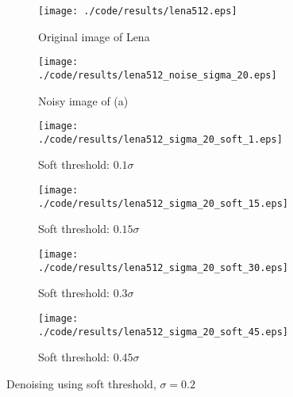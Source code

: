 \documentclass[journal,comsoc]{IEEEtran}
\begin{document}
\begin{figure}[!hbt]
  \centering
  \begin{subfigure}{.25\textwidth}
    \centering
    \texttt{[image: ./code/results/lena512.eps]}
    \caption{Original image of Lena}
    \label{subfig:original-image-of-lena}
  \end{subfigure}%
  \begin{subfigure}{.25\textwidth}
    \centering
    \texttt{[image: ./code/results/lena512\_noise\_sigma\_20.eps]}
    \caption{Noisy image of (a)}
    \label{subfig:sigma-10-noisy-image-of-a}
  \end{subfigure}

  \begin{subfigure}{0.25\textwidth}
    \centering{}
    \texttt{[image: ./code/results/lena512\_sigma\_20\_soft\_1.eps]}
    \caption{Soft threshold: $0.1\sigma$}
  \end{subfigure}%
  \begin{subfigure}{.25\textwidth}
    \centering{}
    \texttt{[image: ./code/results/lena512\_sigma\_20\_soft\_15.eps]}
    \caption{Soft threshold: $0.15\sigma$}
  \end{subfigure}

  \begin{subfigure}{0.25\textwidth}
    \centering{}
    \texttt{[image: ./code/results/lena512\_sigma\_20\_soft\_30.eps]}
    \caption{Soft threshold: $0.3\sigma$}
  \end{subfigure}%
  \begin{subfigure}{.25\textwidth}
    \centering{}
    \texttt{[image: ./code/results/lena512\_sigma\_20\_soft\_45.eps]}
    \caption{Soft threshold: $0.45\sigma$}
  \end{subfigure}
  
  \caption{Denoising using soft threshold, $\sigma=0.2$}
  \label{fig:sigma-20-soft-threshold}
\end{figure}
\end{document}
